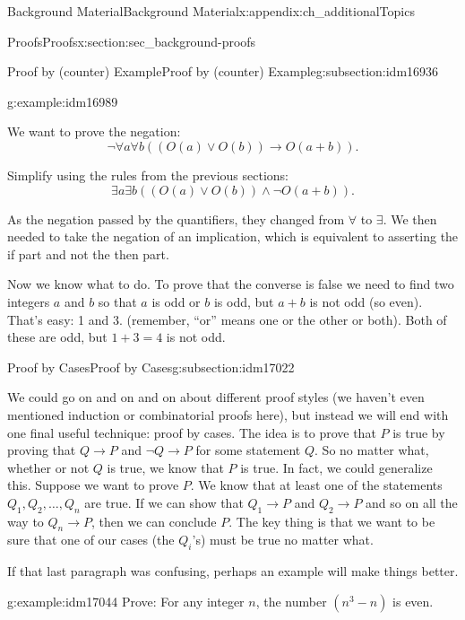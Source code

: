\documentclass[oneside,10pt,]{book}
\numberwithin{equation}{chapter}
\def\imp{\rightarrow}
\begin{document}
\begin{appendixptx}{Background Material}{}{Background Material}{}{}{x:appendix:ch_additionalTopics}
\begin{sectionptx}{Proofs}{}{Proofs}{}{}{x:section:sec_background-proofs}
\begin{subsectionptx}{Proof by (counter) Example}{}{Proof by (counter) Example}{}{}{g:subsection:idm16936}
\begin{example}{}{g:example:idm16989}
%
\par
We want to prove the negation:%
\begin{equation*}
\neg \forall a \forall b ((O(a) \vee O(b)) \imp O(a+b)).
\end{equation*}
%
\par
Simplify using the rules from the previous sections:%
\begin{equation*}
\exists a \exists b ((O(a) \vee O(b)) \wedge \neg O(a+b)).
\end{equation*}
%
\par
As the negation passed by the quantifiers, they changed from \(\forall\) to \(\exists\). We then needed to take the negation of an implication, which is equivalent to asserting the if part and not the then part.%
\par
Now we know what to do. To prove that the converse is false we need to find two integers \(a\) and \(b\) so that \(a\) is odd or \(b\) is odd, but \(a+b\) is not odd (so even). That's easy: 1 and 3. (remember, ``or'' means one or the other or both). Both of these are odd, but \(1+3 = 4\) is not odd.%
\end{example}
\end{subsectionptx}
%
%
\typeout{************************************************}
\typeout{************************************************}
%
\begin{subsectionptx}{Proof by Cases}{}{Proof by Cases}{}{}{g:subsection:idm17022}
%
\par
We could go on and on and on about different proof styles (we haven't even mentioned induction or combinatorial proofs here), but instead we will end with one final useful technique: proof by cases. The idea is to prove that \(P\) is true by proving that \(Q \imp P\) and \(\neg Q \imp P\) for some statement \(Q\). So no matter what, whether or not \(Q\) is true, we know that \(P\) is true. In fact, we could generalize this. Suppose we want to prove \(P\). We know that at least one of the statements \(Q_1, Q_2, \ldots, Q_n\) are true. If we can show that \(Q_1 \imp P\) and \(Q_2 \imp P\) and so on all the way to \(Q_n \imp P\), then we can conclude \(P\). The key thing is that we want to be sure that one of our cases (the \(Q_i\)'s) must be true no matter what.%
\par
If that last paragraph was confusing, perhaps an example will make things better.%
\begin{example}{}{g:example:idm17044}%
Prove: For any integer \(n\), the number \((n^3 -n)\) is even.%

\end{example}
\end{subsectionptx}
\end{sectionptx}
\end{appendixptx}
\end{document}
